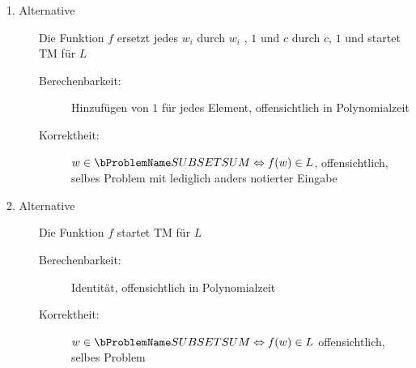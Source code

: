 \documentclass{bschlangaul-aufgabe}
\begin{document}
\begin{enumerate}
\begin{bAntwort}
\begin{description}
%

\item[1. Alternative]

Die Funktion $f$ ersetzt jedes $w_i$ durch $w_i$ , $1$ und $c$ durch
$c$, $1$ und startet TM für $L$

\begin{description}
\item[Berechenbarkeit:]

Hinzufügen von $1$ für jedes Element, offensichtlich in Polynomialzeit

\item[Korrektheit:]

$w \in \ssp \Leftrightarrow f (w) \in L$, offensichtlich, selbes Problem
mit lediglich anders notierter Eingabe
\end{description}

%

\item[2. Alternative]

Die Funktion $f$ startet TM für $L$

\begin{description}
\item[Berechenbarkeit:]

Identität, offensichtlich in Polynomialzeit

\item[Korrektheit:]

$w \in \ssp \Leftrightarrow f (w) \in L$ offensichtlich, selbes Problem

\end{description}

\end{description}
\end{bAntwort}

\end{enumerate}
\end{document}
